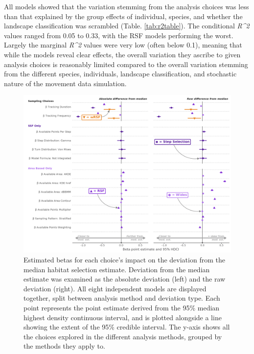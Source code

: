 \documentclass[10pt,a4paper]{article}
\begin{document}
All models showed that the variation stemming from the analysis choices was less than that explained by the group effects of individual, species, and whether the landscape classification was scrambled (Table. \ref{tab:r2table}).
The conditional \emph{R\^{}2} values ranged from 0.05 to 0.33, with the RSF models performing the worst.
Largely the marginal \emph{R\^{}2} values were very low (often below 0.1), meaning that while the models reveal clear effects, the overall variation they ascribe to given analysis choices is reasonably limited compared to the overall variation stemming from the different species, individuals, landscape classification, and stochastic nature of the movement data simulation.

\begin{figure}
\includegraphics[width=1\linewidth]{../figures/_allEffectsPlot} \caption{Estimated betas for each choice's impact on the deviation from the median habitat selection estimate. Deviation from the median estimate was examined as the absolute deviation (left) and the raw deviation (right). All eight independent models are displayed together, split between analysis method and deviation type. Each point represents the point estimate derived from the 95\% median highest density continuous interval, and is plotted alongside a line showing the extent of the 95\% credible interval. The y-axis shows all the choices explored in the different analysis methods, grouped by the methods they apply to.}\label{fig:brmsAllEffectsPlot}
\end{figure}
\end{document}
